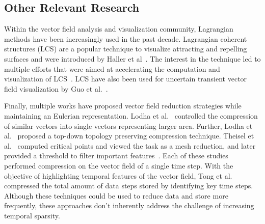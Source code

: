 \subsection{Other Relevant Research}
Within the vector field analysis and visualization community, Lagrangian methods have been increasingly used in the past decade.
%
Lagrangian coherent structures (LCS) are a popular technique to visualize attracting and repelling surfaces and were introduced by Haller et al~\cite{haller2001distinguished, haller2000lagrangian, haller2000finding}.
%
The interest in the technique led to multiple efforts that were aimed at accelerating the computation and visualization of LCS~\cite{garth2007efficient,garth2009visualization,sadlo2007efficient,sadlo2011time}.
%
LCS have also been used for uncertain transient vector field visualization by Guo et al.~\cite{guo2016finite}.
%

Finally, multiple works have proposed vector field reduction strategies while maintaining an Eulerian representation.
%
Lodha et al.~\cite{lodha2000topology} controlled the compression of similar vectors into single vectors representing larger area.
%
Further, Lodha et al.~\cite{lodha2003topology} proposed a top-down topology preserving compression technique.
%
Theisel et al.~\cite{theisel2003combining} computed critical points and viewed the task as a mesh reduction, and later provided a threshold to filter important features~\cite{theisel2003compression}.
%
Each of these studies performed compression on the vector field of a single time step.
%
With the objective of highlighting temporal features of the vector field, Tong et al.~\cite{tong2012salient} compressed the total amount of data steps stored by identifying key time steps.
%
Although these techniques could be used to reduce data and store more frequently, these approaches don't inherently address the challenge of increasing temporal sparsity.
%




